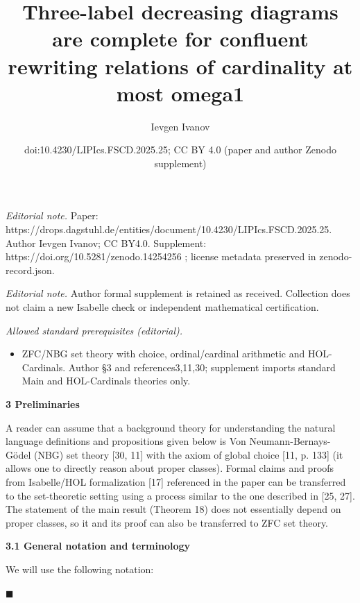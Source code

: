 \documentclass[10pt,a4paper]{amsart}
\title{Three-label decreasing diagrams are complete for confluent rewriting relations of cardinality at most omega1}
\author{Ievgen Ivanov}
\date{doi:10.4230/LIPIcs.FSCD.2025.25; CC BY 4.0 (paper and author Zenodo supplement)}
\begin{document}
\maketitle
\noindent\textit{Editorial note.} Paper: https://drops.dagstuhl.de/entities/document/10.4230/LIPIcs.FSCD.2025.25. Author Ievgen Ivanov; CC BY4.0. Supplement: https://doi.org/10.5281/zenodo.14254256 ; license metadata preserved in zenodo-record.json.\par\medskip
\noindent\textit{Editorial note.} Author formal supplement is retained as received. Collection does not claim a new Isabelle check or independent mathematical certification.\par\medskip
\noindent\textit{Allowed standard prerequisites (editorial).}\begin{itemize}
\item ZFC/NBG set theory with choice, ordinal/cardinal arithmetic and HOL-Cardinals. Author §3 and references3,11,30; supplement imports standard Main and HOL-Cardinals theories only.
\end{itemize}\medskip
 
\par\medskip\noindent\textbf{3 Preliminaries}\par
 
 
A reader can assume that a background theory for understanding the natural language definitions and propositions given below is Von Neumann-Bernays-Gödel (NBG) set theory [30, 11] with the axiom of global choice [11, p. 133] (it allows one to directly reason about proper classes). Formal claims and proofs from Isabelle/HOL formalization [17] referenced in the paper can be transferred to the set-theoretic setting using a process similar to the one described in [25, 27]. The statement of the main result (Theorem 18) does not essentially depend on proper classes, so it and its proof can also be transferred to ZFC set theory.\par
 
 
 
\par\medskip\noindent\textbf{3.1 General notation and terminology}\par
 
 
We will use the following notation:\par
  
\par\noindent  $\blacksquare$ 
 
\end{document}
